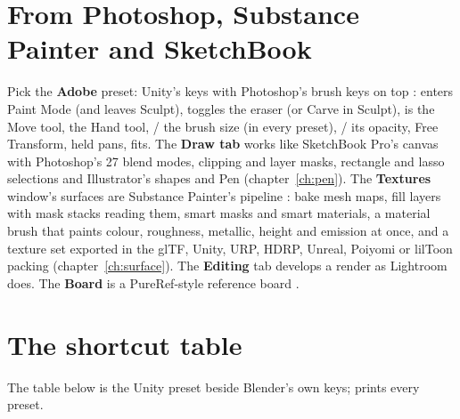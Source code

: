 \section{From Photoshop, Substance Painter and SketchBook}
Pick the \textbf{Adobe} preset: Unity's keys with Photoshop's brush keys on top \cite{PhotoshopHelp2026}: 
enters Paint Mode (and leaves Sculpt),  toggles the eraser (or Carve in Sculpt),  is the Move tool, 
the Hand tool, \key{[} / \key{]} the brush size (in every preset), \key{Shift+[} / \key{]} its opacity, 
Free Transform,  held pans,  fits. The \textbf{Draw tab} works like SketchBook Pro's canvas
\cite{SketchBookDocs2026} with Photoshop's 27 blend modes, clipping and layer masks, rectangle and lasso selections
and Illustrator's shapes and Pen (chapter~\ref{ch:pen}). The \textbf{Textures} window's surfaces are Substance
Painter's pipeline \cite{SubstancePainterDocs2026}: bake mesh maps, fill layers with mask stacks reading them, smart
masks and smart materials, a material brush that paints colour, roughness, metallic, height and emission at once, and
a texture set exported in the glTF, Unity, URP, HDRP, Unreal, Poiyomi or lilToon packing (chapter~\ref{ch:surface}).
The \textbf{Editing} tab develops a render as Lightroom does. The \textbf{Board} is a PureRef-style reference board
\cite{PureRef2026}.

\section{The shortcut table}
The table below is the Unity preset beside Blender's own keys;  prints every preset.

